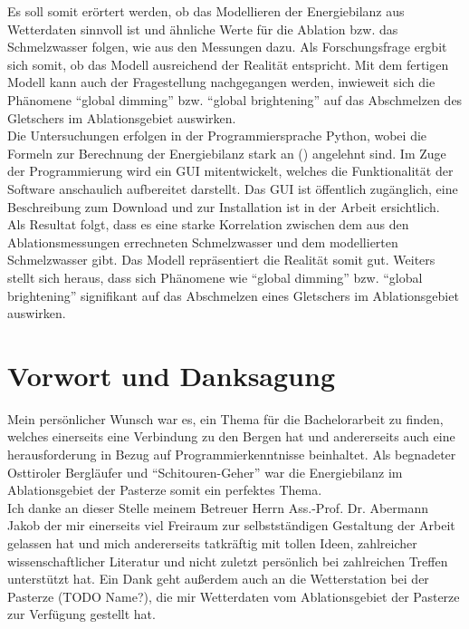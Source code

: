 \documentclass[11pt,a4paper]{article}
\begin{document}
Es soll somit erörtert werden, ob das Modellieren der Energiebilanz aus Wetterdaten sinnvoll ist und ähnliche Werte für die Ablation bzw. das Schmelzwasser folgen, wie aus den Messungen dazu. Als Forschungsfrage ergbit sich somit, ob das Modell ausreichend der Realität entspricht. Mit dem fertigen Modell kann auch der Fragestellung nachgegangen werden, inwieweit sich die Phänomene ``global dimming'' bzw. ``global brightening'' auf das Abschmelzen des Gletschers im Ablationsgebiet auswirken.\\

Die Untersuchungen erfolgen in der Programmiersprache Python, wobei die Formeln zur Berechnung der Energiebilanz stark an \citeauthor{ThePhysicsOfGlaciers} (\citeyear[153-157]{ThePhysicsOfGlaciers}) angelehnt sind. Im Zuge der Programmierung wird ein GUI mitentwickelt, welches die Funktionalität der Software anschaulich aufbereitet darstellt. Das GUI ist öffentlich zugänglich, eine Beschreibung zum Download und zur Installation ist in der Arbeit ersichtlich.\\

Als Resultat folgt, dass es eine starke Korrelation zwischen dem aus den Ablationsmessungen errechneten Schmelzwasser und dem modellierten Schmelzwasser gibt. Das Modell repräsentiert die Realität somit gut. Weiters stellt sich heraus, dass sich Phänomene wie ``global dimming'' bzw. ``global brightening'' signifikant auf das Abschmelzen eines Gletschers im Ablationsgebiet auswirken.\\


\pagebreak
\section*{Vorwort und Danksagung}
Mein persönlicher Wunsch war es, ein Thema für die Bachelorarbeit zu finden, welches einerseits eine Verbindung zu den Bergen hat und andererseits auch eine herausforderung in Bezug auf Programmierkenntnisse beinhaltet. Als begnadeter Osttiroler Bergläufer und ``Schitouren-Geher'' war die Energiebilanz im Ablationsgebiet der Pasterze somit ein perfektes Thema.\\

Ich danke an dieser Stelle meinem Betreuer Herrn Ass.-Prof. Dr. Abermann Jakob der mir einerseits viel Freiraum zur selbstständigen Gestaltung der Arbeit gelassen hat und mich andererseits tatkräftig mit tollen Ideen, zahlreicher wissenschaftlicher Literatur und nicht zuletzt persönlich bei zahlreichen Treffen unterstützt hat. Ein Dank geht außerdem auch an die Wetterstation bei der Pasterze (TODO Name?), die mir Wetterdaten vom Ablationsgebiet der Pasterze zur Verfügung gestellt hat.\\
\end{document}
